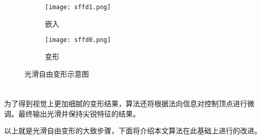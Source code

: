 \begin{figure}[htbp]
	\centering
	\begin{subfigure}[b]{.4\textwidth}
		\centering
		\texttt{[image: sffd1.png]}
		\caption{嵌入}\label{subfig:sffd_0}
	\end{subfigure}
	\quad
	\begin{subfigure}[b]{.4\textwidth}
		\centering
		\texttt{[image: sffd0.png]}
		\caption{变形}\label{subfig:sffd_1}
	\end{subfigure}
    \caption{光滑自由变形示意图}\label{fig:sffd}
\end{figure}


\section{}
为了得到视觉上更加细腻的变形结果，算法还将根据法向信息对控制顶点进行微调。最终输出光滑并保持尖锐特征的结果。

以上就是光滑自由变形的大致步骤，下面将介绍本文算法在此基础上进行的改进。

